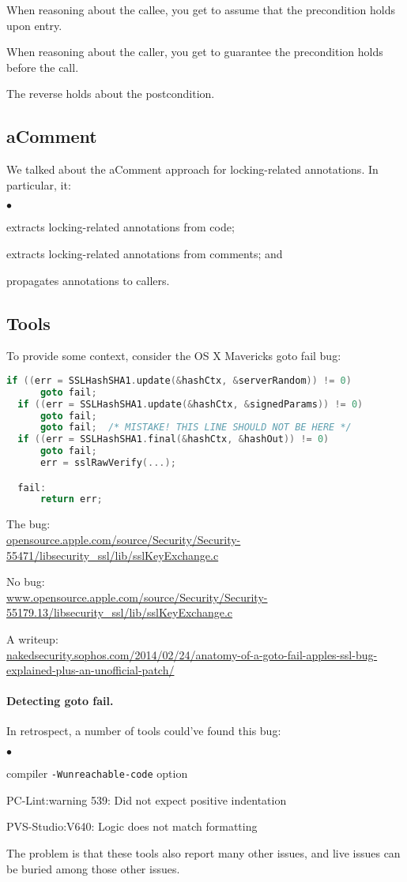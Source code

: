 \documentclass[11pt]{article}
\newcommand{\squishlist}{
 \begin{list}{$\bullet$}
  { \setlength{\itemsep}{0pt}
     \setlength{\parsep}{3pt}
     \setlength{\topsep}{3pt}
     \setlength{\partopsep}{0pt}
     \setlength{\leftmargin}{1.5em}
     \setlength{\labelwidth}{1em}
     \setlength{\labelsep}{0.5em} } }
\newcommand{\squishend}{
  \end{list}  }
\begin{document}
  When reasoning about the callee, you get to assume that the precondition holds upon entry.

  When reasoning about the caller, you get to guarantee the precondition holds before the call.

  The reverse holds about the postcondition.

\subsection*{aComment}
We talked about the aComment approach for locking-related annotations.
In particular, it:
\squishlist
\item extracts locking-related annotations from code;
\item extracts locking-related annotations from comments; and
\item propagates annotations to callers.
  \squishend

\subsection*{Tools}

To provide some context, consider the OS X Mavericks goto fail bug:

{ \scriptsize
\begin{lstlisting}[language=C]
  if ((err = SSLHashSHA1.update(&hashCtx, &serverRandom)) != 0)
      goto fail;
  if ((err = SSLHashSHA1.update(&hashCtx, &signedParams)) != 0)
      goto fail;
      goto fail;  /* MISTAKE! THIS LINE SHOULD NOT BE HERE */
  if ((err = SSLHashSHA1.final(&hashCtx, &hashOut)) != 0)
      goto fail;
      err = sslRawVerify(...);

  fail:
      return err;
\end{lstlisting}
}

The bug:\\
{\scriptsize \url{opensource.apple.com/source/Security/Security-55471/libsecurity_ssl/lib/sslKeyExchange.c} }

No bug:\\
{\scriptsize \url{www.opensource.apple.com/source/Security/Security-55179.13/libsecurity_ssl/lib/sslKeyExchange.c} }

A writeup:\\ {\scriptsize \url{nakedsecurity.sophos.com/2014/02/24/anatomy-of-a-goto-fail-apples-ssl-bug-explained-plus-an-unofficial-patch/}}

\paragraph{Detecting goto fail.}
In retrospect, a number of tools could've found this bug:
\squishlist
    \item compiler {\tt -Wunreachable-code} option
    \item PC-Lint:warning 539: Did not expect positive indentation
    \item PVS-Studio:V640: Logic does not match formatting
\squishend
The problem is that these tools also report many other issues, and live issues can be
buried among those other issues.
\end{document}

